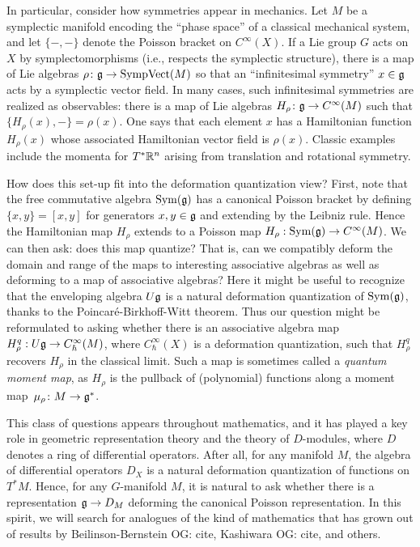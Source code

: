 \documentclass[11pt]{amsart}
\def\owen#1{{\textcolor{violet!65!black}{OG: {#1}}}}
\begin{document}
In particular, consider how symmetries appear in mechanics.
Let $M$ be a symplectic manifold encoding the ``phase space'' of a classical mechanical system,
and let $\{-,-\}$ denote the Poisson bracket on $C^\infty(X)$.
If a Lie group $G$ acts on $X$ by symplectomorphisms (i.e., respects the symplectic structure),
there is a map of Lie algebras $\rho \colon\mathfrak g \to {\rm SympVect}(M)$ so that an ``infinitesimal symmetry'' $x \in \mathfrak g$ acts by a symplectic vector field.
In many cases, such infinitesimal symmetries are realized as observables: 
there is a map of Lie algebras $H_\rho \colon \mathfrak g \to C^\infty(M)$ such that $\{ H_\rho(x), - \} = \rho(x)$.
One says that each element $x$ has a Hamiltonian function $H_\rho(x)$ whose associated Hamiltonian vector field is $\rho(x)$.
Classic examples include the momenta for $T^* \mathbb R^n$ arising from translation and rotational symmetry.

How does this set-up fit into the deformation quantization view?
First, note that the free commutative algebra $\operatorname{Sym}(\mathfrak g)$ has a canonical Poisson bracket by defining $ \{x, y \}   = [x, y]$ for generators $x, y \in \mathfrak g$ and extending by the Leibniz rule.
Hence the Hamiltonian map $H_\rho$ extends to a Poisson map $H_\rho: \operatorname{Sym}(\mathfrak g) \to C^\infty(M)$.
We can then ask: does this map quantize? That is, can we compatibly deform the domain and range of the maps to interesting associative algebras as well as deforming to a map of associative algebras?
Here it might be useful to recognize that the enveloping algebra $U\mathfrak g$ is a natural deformation quantization of $\operatorname{Sym}(\mathfrak g)$, thanks to the Poincar\'e-Birkhoff-Witt theorem.
Thus our question might be reformulated to asking whether there is an associative algebra map $H^q_\rho: U\mathfrak g \to C_\hbar^\infty(M)$, where $C_\hbar^\infty(X)$ is a deformation quantization, such that $H^q_\rho$ recovers $H_\rho$ in the classical limit.
Such a map is sometimes called a {\em quantum moment map},
as $H_\rho$ is the pullback of (polynomial) functions along a moment map~$\mu_\rho \colon M \to \mathfrak g^*$.

This class of questions appears throughout mathematics,
and it has played a key role in geometric representation theory and the theory of $D$-modules, where $D$ denotes a ring of differential operators.
After all, for any manifold $M$, the algebra of differential operators $D_X$ is a natural deformation quantization of functions on $T^* M$.
Hence, for any $G$-manifold $M$, it is natural to ask whether there is a representation $\mathfrak g \to D_M$ deforming the canonical Poisson representation.
In this spirit, we will search for analogues of the kind of mathematics that has grown out of results by Beilinson-Bernstein \owen{cite}, Kashiwara \owen{cite}, and others.
\end{document}
